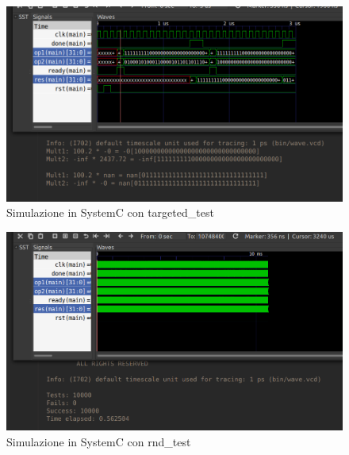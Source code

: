 \documentclass[]{IEEEtran}
\begin{document}
\begin{figure}[bt]
\centering
\includegraphics[width=\textwidth]{figures/simulazione2}
\caption{Simulazione in SystemC con targeted\_test}
\label{fig:SIM2}
\end{figure}

\begin{figure}[bt]
\centering
\includegraphics[width=\textwidth]{figures/simulazione3}
\caption{Simulazione in SystemC con rnd\_test}
\label{fig:SIM3}
\end{figure}
\end{document}
